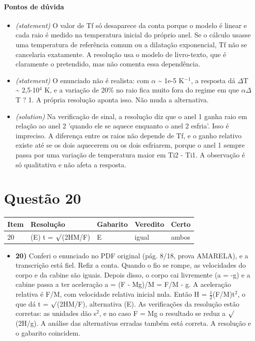 \documentclass{article}%
\begin{document}
\paragraph{Pontos de dúvida}%
\begin{itemize}%
\item%
\textit{(statement)} O valor de Tf só desaparece da conta porque o modelo é linear e cada raio é medido na temperatura inicial do próprio anel. Se o cálculo usasse uma temperatura de referência comum ou a dilatação exponencial, Tf não se cancelaria exatamente. A resolução usa o modelo de livro{-}texto, que é claramente o pretendido, mas não comenta essa dependência.%
\item%
\textit{(statement)} O enunciado não é realista: com $\alpha$ \textasciitilde{} 1e{-}5 K$^{-}$$^{1}$, a resposta dá $\Delta$T \textasciitilde{} 2,5$\cdot$10$^{4}$ K, e a variação de 20\% no raio fica muito fora do regime em que $\alpha$$\Delta$T ? 1. A própria resolução aponta isso. Não muda a alternativa.%
\item%
\textit{(solution)} Na verificação de sinal, a resolução diz que o anel 1 ganha raio em relação ao anel 2 'quando ele se aquece enquanto o anel 2 esfria'. Isso é impreciso. A diferença entre os raios não depende de Tf, e o ganho relativo existe até se os dois aquecerem ou os dois esfriarem, porque o anel 1 sempre passa por uma variação de temperatura maior em Ti2 - Ti1. A observação é só qualitativa e não afeta a resposta.%
\end{itemize}%
\section*{Questão 20}%
\begin{longtable}{@{}p{} p{} p{} p{} p{}@{}}\toprule Item & Resolução & Gabarito & Veredito & Certo \\ \midrule
20 & (E) t = $\surd$(2HM/F) & E & igual & ambos \\
\bottomrule\end{longtable}%
\begin{itemize}%
\item%
\textbf{20)} Conferi o enunciado no PDF original (pág. 8/18, prova AMARELA), e a transcrição está fiel. Refiz a conta. Quando o fio se rompe, as velocidades do corpo e da cabine são iguais. Depois disso, o corpo cai livremente (a = -g) e a cabine passa a ter aceleração a = (F - Mg)/M = F/M - g. A aceleração relativa é F/M, com velocidade relativa inicial nula. Então H = $\frac12$(F/M)t$^2$, o que dá t = $\surd$(2HM/F), alternativa (E). As verificações da resolução estão corretas: as unidades dão s$^2$, e no caso F = Mg o resultado se reduz a $\surd$(2H/g). A análise das alternativas erradas também está correta. A resolução e o gabarito coincidem.%
\end{itemize}%
\end{document}
